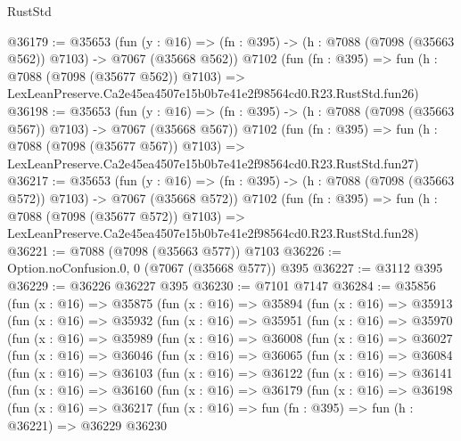 \begin{lexlean}{RustStd}
\begin{coremodule}
@36179 := @35653
    (fun (y : @16) => (fn : @395) -> (h : @7088 (@7098 (@35663 @562)) @7103) -> @7067 (@35668 @562))
    @7102
    (fun (fn : @395) =>
    fun (h : @7088 (@7098 (@35677 @562)) @7103) =>
    LexLeanPreserve.Ca2e45ea4507e15b0b7e41e2f98564cd0.R23.RustStd.fun26)
@36198 := @35653
    (fun (y : @16) => (fn : @395) -> (h : @7088 (@7098 (@35663 @567)) @7103) -> @7067 (@35668 @567))
    @7102
    (fun (fn : @395) =>
    fun (h : @7088 (@7098 (@35677 @567)) @7103) =>
    LexLeanPreserve.Ca2e45ea4507e15b0b7e41e2f98564cd0.R23.RustStd.fun27)
@36217 := @35653
    (fun (y : @16) => (fn : @395) -> (h : @7088 (@7098 (@35663 @572)) @7103) -> @7067 (@35668 @572))
    @7102
    (fun (fn : @395) =>
    fun (h : @7088 (@7098 (@35677 @572)) @7103) =>
    LexLeanPreserve.Ca2e45ea4507e15b0b7e41e2f98564cd0.R23.RustStd.fun28)
@36221 := @7088 (@7098 (@35663 @577)) @7103
@36226 := Option.noConfusion.{0, 0} (@7067 (@35668 @577)) @395
@36227 := @3112 @395
@36229 := @36226 @36227 @395
@36230 := @7101 @7147
@36284 := @35856
    (fun (x : @16) =>
    @35875
      (fun (x : @16) =>
      @35894
        (fun (x : @16) =>
        @35913
          (fun (x : @16) =>
          @35932
            (fun (x : @16) =>
            @35951
              (fun (x : @16) =>
              @35970
                (fun (x : @16) =>
                @35989
                  (fun (x : @16) =>
                  @36008
                    (fun (x : @16) =>
                    @36027
                      (fun (x : @16) =>
                      @36046
                        (fun (x : @16) =>
                        @36065
                          (fun (x : @16) =>
                          @36084
                            (fun (x : @16) =>
                            @36103
                              (fun (x : @16) =>
                              @36122
                                (fun (x : @16) =>
                                @36141
                                  (fun (x : @16) =>
                                  @36160
                                    (fun (x : @16) =>
                                    @36179
                                      (fun (x : @16) =>
                                      @36198
                                        (fun (x : @16) =>
                                        @36217
                                          (fun (x : @16) =>
                                          fun (fn : @395) =>
                                          fun (h : @36221) =>
                                          @36229
                                            @36230

\end{coremodule}
\end{lexlean}
